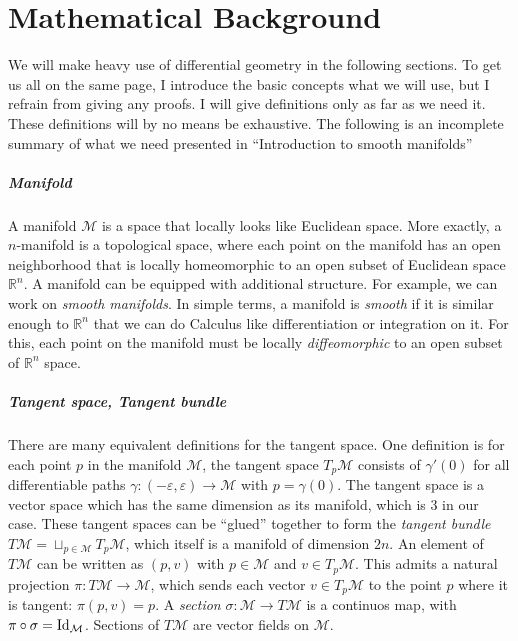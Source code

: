 \documentclass[../thesis.tex]{subfiles}
\begin{document}
\chapter{Mathematical Background}
We will make heavy use of differential geometry in the following sections.
To get us all on the same page, I introduce the basic concepts what we will use, but I refrain from
giving any proofs. I will give definitions only as far as we need it. These definitions
will by no means be exhaustive. The following is an incomplete summary of what we need presented in
``Introduction to smooth manifolds'' \cite{Lee00}

\paragraph{Manifold} A manifold $\mathcal{M}$ is a space that locally looks like Euclidean space.
More exactly, a $n$-manifold is a topological space, where each point on the manifold has an open neighborhood
that is locally homeomorphic to an open subset of Euclidean space $\mathbb{R}^n$.
A manifold can be equipped with additional structure. For example, we can work on \emph{smooth manifolds}.
In simple terms, a manifold is \emph{smooth} if it is similar enough to $\mathbb{R}^n$ that we can do Calculus
like differentiation or integration on it. For this, each point on the manifold must be
locally \emph{diffeomorphic} to an open subset of $\mathbb{R}^n$ space.

\paragraph{Tangent space, Tangent bundle} There are many equivalent definitions
for the tangent space. One definition is for each point $p$ in the manifold $\mathcal{M}$,
the tangent space $T_p\mathcal{M}$ consists of $\gamma'(0)$ for all differentiable paths $\gamma: (-\varepsilon, \varepsilon) \to \mathcal{M}$
with $p = \gamma(0)$. The tangent space is a vector space which has the same dimension as its manifold,
which is 3 in our case. These tangent spaces can be ``glued'' together to form the
\emph{tangent bundle} $T\mathcal{M} = \sqcup _{p \in \mathcal{M}}T_p\mathcal{M}$, which itself
is a manifold of dimension $2n$. An element of $T\mathcal{M}$ can be written
as $(p,v)$ with $p \in \mathcal{M}$ and $v \in T_p\mathcal{M}$. This admits a natural projection $\pi : T\mathcal{M} \to \mathcal{M}$,
which sends each vector $v \in T_p\mathcal{M}$ to the point $p$ where it is tangent: $\pi(p,v)=p$.
A \emph{section} $\sigma: \mathcal{M} \to T\mathcal{M}$ is a continuos map, with $\pi \circ \sigma = \operatorname{Id}_{\mathcal{M}}$.
Sections of $T\mathcal{M}$ are vector fields on $\mathcal{M}$.
\end{document}
